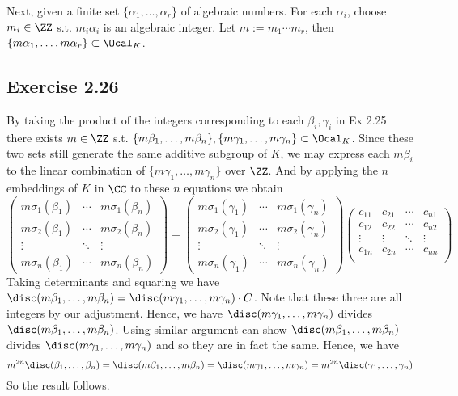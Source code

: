 \documentclass[../Chapter.tex]{subfiles}
\begin{document}
Next, given a finite set $\{\alpha_1,\ldots,\alpha_r\}$ of algebraic numbers. For each $\alpha_i$, choose $m_i\in \ZZ$ s.t. $m_i\alpha_i$ is an algebraic integer. Let $m:=m_1\cdots m_r$, then $\{m\alpha_1,\ldots,m\alpha_r\} \subset \Ocal_K$.

\subsection*{Exercise 2.26}

By taking the product of the integers corresponding to each $\beta_i,\gamma_i$ in Ex 2.25 there exists $m\in\ZZ$ s.t. $\{m\beta_1,\ldots,m\beta_n\},\{m\gamma_1,\ldots,m\gamma_n\}\subset\Ocal_K$. Since these two sets still generate the same additive subgroup of $K$, we may express each $m\beta_i$ to the linear combination of $\{m\gamma_1,\ldots,m\gamma_n\}$ over $\ZZ$. And by applying the $n$ embeddings of $K$ in $\CC$ to these $n$ equations we obtain
$$\begin{pmatrix}
m\sigma_1(\beta_1)  &  \cdots & m\sigma_1(\beta_n)  \\
m\sigma_2(\beta_1) &  \cdots & m\sigma_2(\beta_n)  \\
\vdots                         &  \ddots & \vdots  \\
m\sigma_n(\beta_1) &  \cdots & m\sigma_n(\beta_n)
\end{pmatrix}=
\begin{pmatrix}
m\sigma_1(\gamma_1)  &  \cdots & m\sigma_1(\gamma_n)  \\
m\sigma_2(\gamma_1) &  \cdots & m\sigma_2(\gamma_n)  \\
\vdots                         &  \ddots & \vdots  \\
m\sigma_n(\gamma_1) &  \cdots & m\sigma_n(\gamma_n)
\end{pmatrix}
\begin{pmatrix}
c_{11}  & c_{21} & \cdots & c_{n1} \\
c_{12} & c_{22} & \cdots & c_{n2} \\
\vdots & \vdots  & \ddots & \vdots \\
c_{1n} & c_{2n} & \cdots & c_{nn} \\
\end{pmatrix}
$$
Taking determinants and squaring we have $\disc(m\beta_1,\ldots,m\beta_n)=\disc(m\gamma_1,\ldots,m\gamma_n)\cdot C$. Note that these three are all integers by our adjustment. Hence, we have $\disc(m\gamma_1,\ldots,m\gamma_n)$ divides $\disc(m\beta_1,\ldots,m\beta_n)$. Using similar argument can show $\disc(m\beta_1,\ldots,m\beta_n)$ divides $\disc(m\gamma_1,\ldots,m\gamma_n)$ and so they are in fact the same. Hence, we have $$m^{2n}\disc(\beta_1,\ldots,\beta_n)=\disc(m\beta_1,\ldots,m\beta_n)=\disc(m\gamma_1,\ldots,m\gamma_n)=m^{2n}\disc(\gamma_1,\ldots,\gamma_n)$$ So the result follows.
\end{document}
